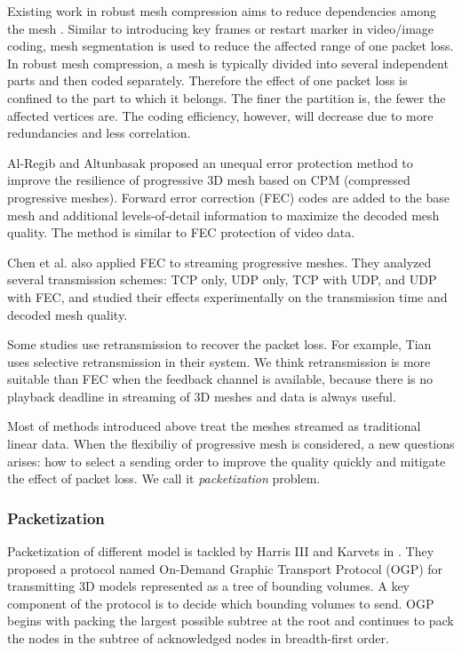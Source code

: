 \documentclass[11pt, a4paper]{report}
\begin{document}
    Existing work in robust mesh compression aims to
    reduce dependencies among the mesh \cite{error:Park,error:Yan}.
    Similar to introducing key frames or restart marker in video/image
    coding, mesh segmentation is used to reduce the affected range of one
    packet loss. In robust mesh compression, a mesh is typically
    divided into several independent parts and then coded separately.
    Therefore the effect of one packet loss is confined to the part to which
    it belongs. The finer the partition is, the fewer the affected vertices
    are.  The coding efficiency, however, will decrease
    due to more redundancies and less correlation.

    Al-Regib and Altunbasak \cite{unequal:Al-Regib} proposed an
    unequal error protection method to improve the resilience of
    progressive 3D mesh based on CPM (compressed progressive meshes). 
    Forward error correction (FEC) codes are added to the
    base mesh and additional levels-of-detail information to maximize 
    the decoded mesh quality.  The method is similar to FEC protection 
    of video data.

    Chen et al. \cite{chen05hybrid} also applied FEC to streaming
    progressive meshes. They analyzed several transmission schemes:
    TCP only, UDP only, TCP with UDP, and UDP with FEC, and studied
    their effects experimentally on the transmission time and decoded
    mesh quality.
    
    Some studies use retransmission to recover the packet loss.
    For example, Tian \cite{Tian2006} uses selective retransmission in their system.
    We think retransmission is more suitable than FEC when the feedback
    channel is available, because there is no playback deadline in streaming
    of 3D meshes and data is always useful.

    Most of methods introduced above treat the meshes streamed as 
    traditional linear data. When the flexibiliy of progressive mesh
    is considered, a new questions arises: how to select a sending order
    to improve the quality quickly and mitigate the effect of packet loss.
    We call it \emph{packetization} problem.
    
    \subsubsection{Packetization}
    \label{ss:intro:packetization}
    Packetization of different model is tackled by
    Harris III and Karvets in \cite{harris:design}.   
    They proposed a protocol named On-Demand Graphic Transport Protocol (OGP)
    for transmitting 3D models represented as a tree of bounding volumes.
    A key component of the protocol is to decide which bounding volumes
    to send.  OGP begins with packing the largest possible subtree at
    the root and continues to pack the nodes in the subtree of
    acknowledged nodes in breadth-first order.  
    
\end{document}
